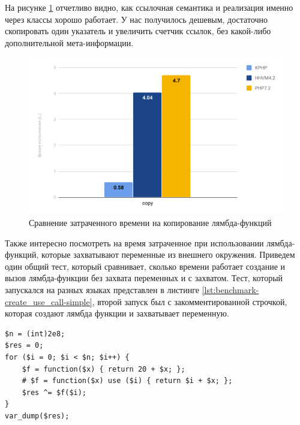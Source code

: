 На рисунке \ref{fig:benchmark-copy-simple} отчетливо видно, как ссылочная семантика и реализация именно через классы хорошо работает.
У нас получилось дешевым, достаточно скопировать один указатель и увеличить счетчик ссылок, без какой-либо дополнительной мета-информации.
\begin{figure}[H]
    \caption{Сравнение затраченного времени на копирование лямбда-функций}
    \label{fig:benchmark-copy-simple}
    \centering
    \includegraphics[width=\linewidth]{images/benchmark_copy_simple}
\end{figure}

Также интересно посмотреть на время затраченное при использовании лямбда-функций, которые захватывают переменные из внешнего окружения.
Приведем один общий тест, который сравнивает, сколько времени работает создание и вызов лямбда-функции без захвата переменных и с захватом.
Тест, который запускался на разных языках представлен в листинге \ref{lst:benchmark-create_use_call-simple}, второй запуск был с закомментированной строчкой, которая создают лямбда функции и захватывает переменную.
\begin{lstlisting}[caption={Бенчмарк создания и вызова анонимных функций с захватом},label={lst:benchmark-create_use_call-simple}]
$n = (int)2e8;
$res = 0;
for ($i = 0; $i < $n; $i++) {
    $f = function($x) { return 20 + $x; };
    # $f = function($x) use ($i) { return $i + $x; };
    $res ^= $f($i);
}
var_dump($res);
\end{lstlisting}

